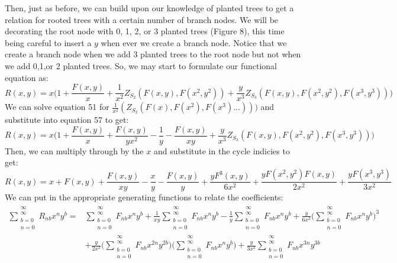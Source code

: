 \documentclass{article}
\begin{document}
Then, just as before, we can build upon our knowledge of planted trees to get a relation for rooted trees with a certain number of branch nodes. We will be decorating the root node with 0, 1, 2, or 3 planted trees (Figure 8), this time being careful to insert a \(y\) when ever we create a branch node. Notice that we create a branch node when we add 3 planted trees to the root node but not when we add 0,1,or 2 planted trees. So, we may start to formulate our functional equation as:
\begin{equation}
R(x,y)=x\Big(1+\frac{F(x,y)}{x}+\frac{1}{x^2}Z_{S_2}(F(x,y),F(x^2,y^2)) +\frac{y}{x^3}Z_{S_3}(F(x,y),F(x^2,y^2),F(x^3,y^3))\Big)
\end{equation}
We can solve equation 51 for \(\frac{1}{x^2}(Z_{S_2}(F(x),F(x^2),F(x^3)...)))\) and substitute into equation 57 to get:
\begin{equation}
R(x,y)=x\Big(1+\frac{F(x,y)}{x}+\frac{F(x,y)}{yx^2} -\frac{1}{y}- \frac{F(x,y)}{xy}+\frac{y}{x^3}Z_{S_3}(F(x,y),F(x^2,y^2),F(x^3,y^3))\Big)
\end{equation}
Then, we can multiply through by the \(x\) and substitute in the cycle indicies to get:
\begin{equation}
R(x,y)=x+F(x,y)+\frac{F(x,y)}{xy}-\frac{x}{y}-\frac{F(x,y)}{y} +\frac{yF^3(x,y)}{6x^2}+\frac{yF(x^2,y^2)F(x,y)}{2x^2}+\frac{yF(x^3,y^3)}{3x^2}
\end{equation}
We can put in the appropriate generating functions to relate the coefficients:
\begin{align}
\sum_{\substack{b=0\\n=0}}^{\substack{\infty\\ \infty}} R_{nb} x^ny^b= &
\sum_{\substack{b=0\\n=0}}^{\substack{\infty\\ \infty}} F_{nb} x^ny^b+
\frac{1}{xy}\sum_{\substack{b=0\\n=0}}^{\substack{\infty\\ \infty}} F_{nb} x^ny^b-
\frac{1}{y}\sum_{\substack{b=0\\n=0}}^{\substack{\infty\\ \infty}} F_{nb} x^ny^b +
\frac{y}{6x^2}\Bigg(\sum_{\substack{b=0\\n=0}}^{\substack{\infty\\ \infty}} F_{nb} x^ny^b\Bigg)^3 \nonumber \\
&+\frac{y}{2x^2}\Bigg(\sum_{\substack{b=0\\n=0}}^{\substack{\infty\\ \infty}} F_{nb} x^{2n}y^{2b}\Bigg)\Bigg(\sum_{\substack{b=0\\n=0}}^{\substack{\infty\\ \infty}} F_{nb} x^ny^b\Bigg)+
\frac{y}{3x^2}\sum_{\substack{b=0\\n=0}}^{\substack{\infty\\ \infty}} F_{nb} x^{3n}y^{3b}
\end{align}
\end{document}
